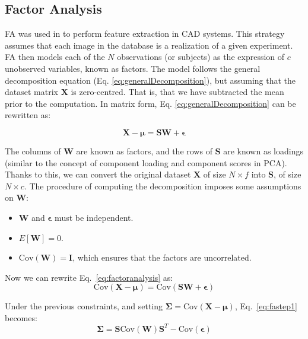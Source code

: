 \subsection{Factor Analysis}
\acf{FA} was used in \cite{Martinez201141,Martinez-Murcia20129676} to perform feature extraction in \ac{CAD} systems. This strategy assumes that each image in the database is a realization of a given experiment. \ac{FA} then models each of the $N$ observations (or subjects) as the expression of $c$ unobserved variables, known as factors. The model follows the general decomposition equation (Eq. \ref{eq:generalDecomposition}), but assuming that the dataset matrix $\mathbf{X}$ is zero-centred. That is, that we have subtracted the mean prior to the computation. In matrix form, Eq. \ref{eq:generalDecomposition} can be rewritten as:

\begin{equation}\label{eq:factoranalysis}
\mathbf{X} -\boldsymbol{\mu}= \mathbf{S}\mathbf{W} +  \boldsymbol{\epsilon}
\end{equation}

The columns of $\mathbf{W}$ are known as factors, and the rows of $\mathbf{S}$ are known as loadings  (similar to the concept of component loading and component scores in \ac{PCA}). Thanks to this, we can convert the original dataset $\mathbf{X}$ of size $N\times f$ into $\mathbf{S}$, of size $N\times c$. The procedure of computing the decomposition imposes some assumptions on $\mathbf{W}$: 
\begin{itemize}
	\item $\mathbf{W}$ and $\boldsymbol{\epsilon}$ must be independent. 
	\item $E[\mathbf{W}] = 0$. 
	\item $\text{Cov}(\mathbf{W}) = \mathbf{I}$, which ensures that the factors are uncorrelated. 
\end{itemize}

Now we can rewrite Eq.~\ref{eq:factoranalysis} as:
\begin{equation}\label{eq:fastep1}
	\text{Cov}(\mathbf{X} -\boldsymbol{\mu})= \text{Cov}(\mathbf{S}\mathbf{W} +  \boldsymbol{\epsilon})
\end{equation} 

Under the previous constraints, and setting $\boldsymbol{\Sigma} = \text{Cov}(\mathbf{X} -\boldsymbol{\mu})$, Eq.~\ref{eq:fastep1} becomes:
\begin{equation}
	\boldsymbol{\Sigma} = \mathbf{S}\text{Cov}(\mathbf{W})\mathbf{S}^T - \text{Cov}(\boldsymbol{\epsilon})
\end{equation}

